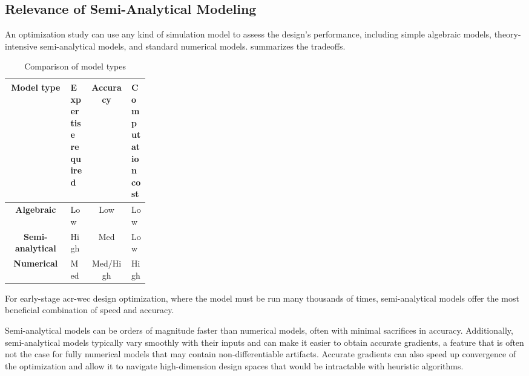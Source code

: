\documentclass[a4paper,fleqn,colorlinks,unicode,lineno]{cas-dc} %
\begin{document}
\subsection{Relevance of Semi-Analytical Modeling}   
An optimization study can use any kind of simulation model to assess the design's performance, including simple algebraic models, theory-intensive semi-analytical models, and standard numerical models.
 summarizes the tradeoffs.

\begin{table}[htbp]
    \centering
    \caption{Comparison of model types}
    \label{tab:model-types}
\begin{tabular}{cM{0.14\linewidth}cM{0.13\linewidth}}
         \textbf{Model type}&  \textbf{Expertise required}&  \textbf{Accuracy}&  \textbf{Computation cost}\\ \hline
         \textbf{Algebraic}&  Low&  Low&  Low\\
         \textbf{Semi-analytical}&  High&  Med&  Low\\
         \textbf{Numerical}&  Med&  Med/High&  High\\
    \end{tabular}
    \end{table}

For early-stage \gls{acr-wec} design optimization, where the model must be run many thousands of times, semi-analytical models offer the most beneficial combination of speed and accuracy.

\ifdefined\DISSERTATION
    Semi-analytical models can be orders of magnitude faster than numerical models, often with minimal sacrifices in accuracy.
    Additionally, semi-analytical models typically vary smoothly with their inputs and can make it easier to obtain accurate gradients, a feature that is often not the case for fully numerical models that may contain non-differentiable artifacts.
    Accurate gradients can also speed up convergence of the optimization and allow it to navigate high-dimension design spaces that would be intractable with heuristic algorithms.
\end{document}
